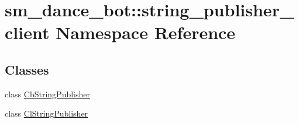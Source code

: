 \hypertarget{namespacesm__dance__bot_1_1string__publisher__client}{}\section{sm\+\_\+dance\+\_\+bot\+:\+:string\+\_\+publisher\+\_\+client Namespace Reference}
\label{namespacesm__dance__bot_1_1string__publisher__client}
\subsection*{Classes}
\begin{DoxyCompactItemize}
\item 
class \hyperlink{classsm__dance__bot_1_1string__publisher__client_1_1CbStringPublisher}{Cb\+String\+Publisher}
\item 
class \hyperlink{classsm__dance__bot_1_1string__publisher__client_1_1ClStringPublisher}{Cl\+String\+Publisher}
\end{DoxyCompactItemize}
